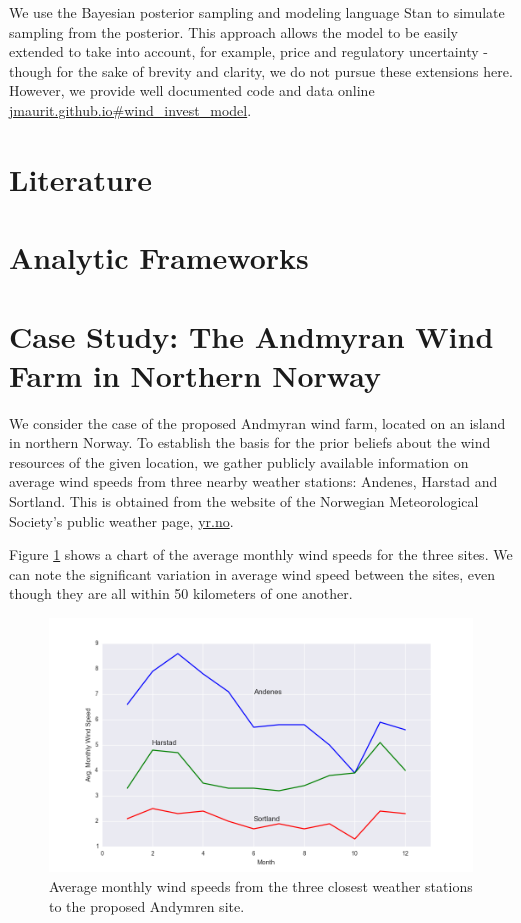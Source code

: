 \documentclass[11pt]{article}
\begin{document}
We use the Bayesian posterior sampling and modeling language Stan \citep{stan_development_team_stan} to simulate sampling from the posterior. This approach allows the model to be easily extended to take into account, for example, price and regulatory uncertainty - though for the sake of brevity and clarity, we do not pursue these extensions here. However, we provide well documented code and data online \url{jmaurit.github.io#wind_invest_model}.

\section{Literature}


\section{Analytic Frameworks}


\section{Case Study: The Andmyran Wind Farm in Northern Norway}

We consider the case of the proposed Andmyran wind farm, located on an island in northern Norway. To establish the basis for the prior beliefs about the wind resources of the given location, we gather publicly available information on average wind speeds from three nearby weather stations: Andenes, Harstad and Sortland. This is obtained from the website of the Norwegian Meteorological Society's public weather page, \url{yr.no}. 

Figure \ref{avg_wind_speed_data} shows a chart of the average monthly wind speeds for the three sites. We can note the significant variation in average wind speed between the sites, even though they are all within 50 kilometers of one another. 

\begin{figure}
	\includegraphics[width=1\textwidth]{figures/avg_wind_speed_data.png}
	\caption{Average monthly wind speeds from the three closest weather stations to the proposed Andymren site.}
	\label{avg_wind_speed_data}
\end{figure}
\end{document}
